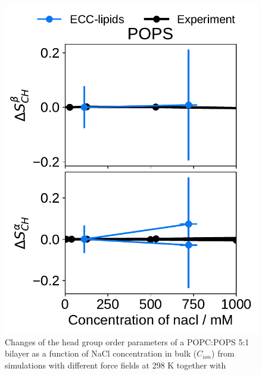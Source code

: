\documentclass[journal=jpcbfk,manuscript=article]{achemso}
\newlength{\figwidth}
\begin{document}
\begin{figure}[htb!]
  \includegraphics[width=\figwidth]{../Fig/l17/order_parameters_changes_A-B_POPS_nacl.pdf} 
  \caption{\label{fig:delta_ordPar_NaCl_l17} 
    Changes of the head group order parameters of a POPC:POPS 5:1 bilayer as a function of NaCl concentration 
    in bulk ($C_{ion}$) from simulations with different force fields at 298 K together with  
  } 
\end{figure} 
\end{document}
